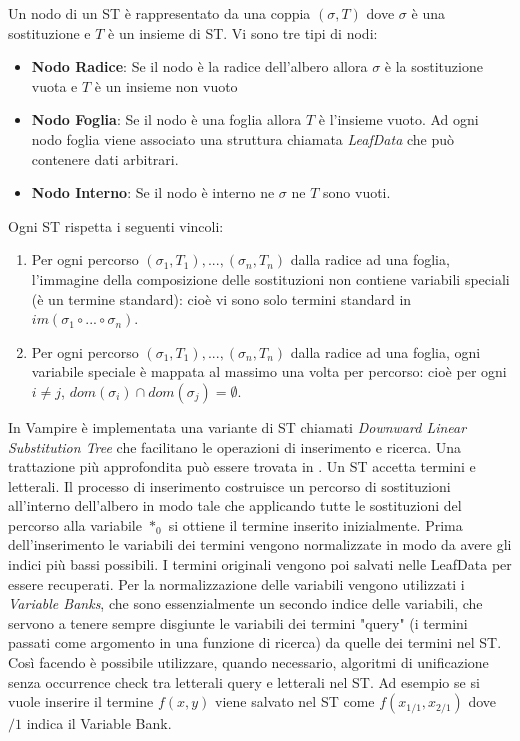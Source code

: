 \documentclass[./main.tex]{subfiles}
\begin{document}
Un nodo di un ST è rappresentato da una coppia $(\sigma, T)$ dove $\sigma$ è una sostituzione e $T$ è un insieme di ST.
Vi sono tre tipi di nodi:

\begin{itemize}
    \item \textbf{Nodo Radice}: Se il nodo è la radice dell'albero allora $\sigma$ è la sostituzione vuota e $T$ è un insieme non vuoto
    \item \textbf{Nodo Foglia}: Se il nodo è una foglia allora $T$ è l'insieme vuoto. Ad ogni nodo foglia 
    viene associato una struttura chiamata \textit{LeafData} che può contenere dati arbitrari.
    \item \textbf{Nodo Interno}: Se il nodo è interno ne $\sigma$ ne $T$ sono vuoti.
\end{itemize}


Ogni ST rispetta i seguenti vincoli:

\begin{enumerate}
    \item Per ogni percorso $(\sigma_1, T_1), ... , (\sigma_n, T_n)$
     dalla radice ad una foglia, l'immagine della composizione delle sostituzioni non contiene variabili speciali (è un termine standard):
     cioè vi sono solo termini standard in $im(\sigma_1 \circ ... \circ \sigma_n)$.
    \item Per ogni percorso $(\sigma_1, T_1), ... , (\sigma_n, T_n)$
    dalla radice ad una foglia, ogni variabile speciale è mappata al massimo una volta per percorso:
    cioè per ogni $i \neq j$, $dom(\sigma_i) \cap dom(\sigma_j) = \emptyset$.
\end{enumerate}

In Vampire è implementata una variante di ST chiamati \textit{Downward Linear Substitution Tree} che facilitano
le operazioni di inserimento e ricerca. Una trattazione più approfondita può essere trovata in \cite{vampireUnification}.
Un ST accetta termini e letterali. Il processo di inserimento costruisce un percorso di sostituzioni all'interno dell'albero
in modo tale che applicando tutte le sostituzioni del percorso alla variabile $*_0$ si ottiene il termine inserito inizialmente.
Prima dell'inserimento le variabili dei termini vengono normalizzate
in modo da avere gli indici più bassi possibili. I termini originali vengono poi salvati nelle LeafData per essere recuperati.
Per la normalizzazione delle variabili vengono utilizzati i \textit{Variable Banks}, che sono essenzialmente un secondo indice delle variabili,
 che servono a tenere sempre disgiunte le variabili dei termini "query" (i termini passati come argomento in una funzione di ricerca)
da quelle dei termini nel ST. Così facendo è possibile utilizzare, quando necessario, algoritmi di unificazione senza occurrence check 
tra letterali query e letterali nel ST.
Ad esempio se si vuole inserire il termine $f(x, y)$ viene salvato nel ST come
$f(x_{1/1}, x_{2/1})$ dove $/1$ indica il Variable Bank.
\end{document}
